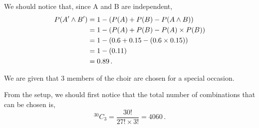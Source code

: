 %
%


\begin{subquestions}
	
\subquestion

We should notice that, since A and B are independent,
\begin{align}
	P(A' \land B') & = 1 - (P(A)+P(B)-P(A \land B)) \nonumber \\
	               & = 1 - (P(A)+P(B)-P(A)\times P(B)) \nonumber \\
	               & = 1 - (0.6+0.15-(0.6\times0.15)) \nonumber \\
	               & = 1 - (0.11) \nonumber \\
	               & = 0.89 \,.
\end{align} 
	

\subquestion

We are given that 3 members of the choir are chosen for a special occasion.

\begin{subsubquestions}
	
\subsubquestion

\begin{subsubsubquestions}
	
\subsubsubquestion

From the setup, we should first notice that the total number of combinations that can be chosen is,
\begin{equation}
	^{30}C_3 = \frac{30!}{27! \times 3!} = 4060 \,.
\end{equation}
	

\end{subsubsubquestions}
\end{subsubquestions}
\end{subquestions}
